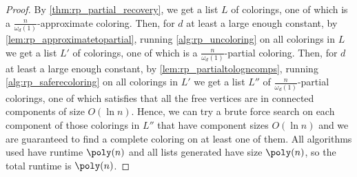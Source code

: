 \begin{proof}
    By \cref{thm:rp_partial_recovery}, we get a list $L$ of colorings, one of which is a $\frac{n}{\omega_d(1)}$-approximate coloring.
    Then, for $d$ at least a large enough constant, by \cref{lem:rp_approximatetopartial}, running \cref{alg:rp_uncoloring} on all colorings in $L$ we get a list $L'$ of colorings, one of which is a $\frac{n}{\omega_d(1)}$-partial coloring. 
    Then, for $d$ at least a large enough constant, by \cref{lem:rp_partialtologncomps}, running \cref{alg:rp_saferecoloring} on all colorings in $L'$ we get a list $L''$ of $\frac{n}{\omega_d(1)}$-partial colorings, one of which satisfies that all the free vertices are in connected components of size $O(\ln{n})$.
    Hence, we can try a brute force search on each component of those colorings in $L''$ that have component sizes $O(\ln{n})$ and we are guaranteed to find a complete coloring on at least one of them.
    All algorithms used have runtime $\poly(n)$ and all lists generated have size $\poly(n)$, so the total runtime is $\poly(n)$.
    \end{proof}
